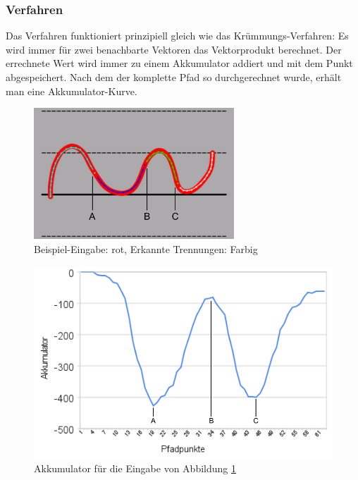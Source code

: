 \subsubsection{Verfahren}
Das Verfahren funktioniert prinzipiell gleich wie das Krümmungs-Verfahren: Es wird immer für zwei benachbarte Vektoren das Vektorprodukt berechnet. Der errechnete Wert wird immer zu einem Akkumulator addiert und mit dem Punkt abgespeichert. Nach dem der komplette Pfad so durchgerechnet wurde, erhält man eine Akkumulator-Kurve.

\begin{figure}[h!]
  \centering
    \includegraphics[width=0.67\textwidth]{./img/akkumulator_beispiel.pdf}
  \caption{Beispiel-Eingabe: rot, Erkannte Trennungen: Farbig}
  \label{drehrichtungBeispiel}
\end{figure}

\begin{figure}[h!]
  \centering
    \includegraphics[width=1.0\textwidth]{./img/akkumulator_diagramm.pdf}
  \caption{Akkumulator für die Eingabe von Abbildung \ref{drehrichtungBeispiel}}
  \label{akkumulatorDiagramm}
\end{figure}

